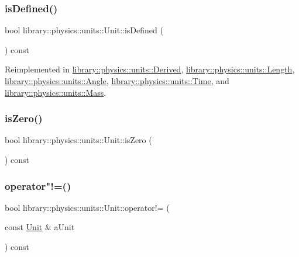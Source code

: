 \subsubsection{\texorpdfstring{is\+Defined()}{isDefined()}}
{\footnotesize\ttfamily bool library\+::physics\+::units\+::\+Unit\+::is\+Defined (\begin{DoxyParamCaption}{ }\end{DoxyParamCaption}) const\hspace{0.3cm}{\ttfamily [virtual]}}



Reimplemented in \hyperlink{classlibrary_1_1physics_1_1units_1_1_derived_a26c20c57fc3a7c2fb2ff215d6d4687a2}{library\+::physics\+::units\+::\+Derived}, \hyperlink{classlibrary_1_1physics_1_1units_1_1_length_a0249a542e7cc613e6a39275b4e37bd05}{library\+::physics\+::units\+::\+Length}, \hyperlink{classlibrary_1_1physics_1_1units_1_1_angle_a77c7849734ce02b55e070fb88fd87f71}{library\+::physics\+::units\+::\+Angle}, \hyperlink{classlibrary_1_1physics_1_1units_1_1_time_ab62163386c3253277c5ba71782261cad}{library\+::physics\+::units\+::\+Time}, and \hyperlink{classlibrary_1_1physics_1_1units_1_1_mass_a0efde6eb08d6b79baa84229746776b6a}{library\+::physics\+::units\+::\+Mass}.

\mbox{\label{classlibrary_1_1physics_1_1units_1_1_unit_a034d99479240b780ab15dbc9eec629f0}} 
\subsubsection{\texorpdfstring{is\+Zero()}{isZero()}}
{\footnotesize\ttfamily bool library\+::physics\+::units\+::\+Unit\+::is\+Zero (\begin{DoxyParamCaption}{ }\end{DoxyParamCaption}) const}

\mbox{\label{classlibrary_1_1physics_1_1units_1_1_unit_a68d7c6e97c9748b43b55b5f74e0f9cda}} 
\subsubsection{\texorpdfstring{operator"!=()}{operator!=()}}
{\footnotesize\ttfamily bool library\+::physics\+::units\+::\+Unit\+::operator!= (\begin{DoxyParamCaption}\item[{const \hyperlink{classlibrary_1_1physics_1_1units_1_1_unit}{Unit} \&}]{a\+Unit }\end{DoxyParamCaption}) const}


